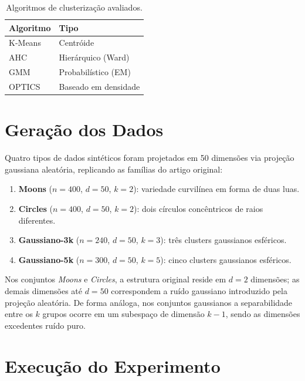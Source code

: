 \documentclass[12pt,a4paper]{report}
\begin{document}
\begin{table}[ht]
  \centering
  \caption{Algoritmos de clusterização avaliados.}
  \label{tab:algos}
  \begin{tabular}{ll}
    \toprule
    Algoritmo & Tipo                \\
    \midrule
    K-Means   & Centróide           \\
    AHC       & Hierárquico (Ward)  \\
    GMM       & Probabilístico (EM) \\
    OPTICS    & Baseado em densidade\\
    \bottomrule
  \end{tabular}
\end{table}

\section{Geração dos Dados}

Quatro tipos de dados sintéticos foram projetados em 50 dimensões via
projeção gaussiana aleatória, replicando as famílias do artigo original:

\begin{enumerate}
  \item \textbf{Moons} ($n = 400$, $d = 50$, $k = 2$): variedade curvilínea
        em forma de duas luas.
  \item \textbf{Circles} ($n = 400$, $d = 50$, $k = 2$): dois círculos
        concêntricos de raios diferentes.
  \item \textbf{Gaussiano-3k} ($n = 240$, $d = 50$, $k = 3$): três clusters
        gaussianos esféricos.
  \item \textbf{Gaussiano-5k} ($n = 300$, $d = 50$, $k = 5$): cinco clusters
        gaussianos esféricos.
\end{enumerate}

Nos conjuntos \textit{Moons} e \textit{Circles}, a estrutura original reside em
$d = 2$ dimensões; as demais dimensões até $d = 50$ correspondem a ruído
gaussiano introduzido pela projeção aleatória. De forma análoga, nos conjuntos
gaussianos a separabilidade entre os $k$ grupos ocorre em um subespaço de
dimensão $k - 1$, sendo as dimensões excedentes ruído puro.

\section{Execução do Experimento}
\end{document}
